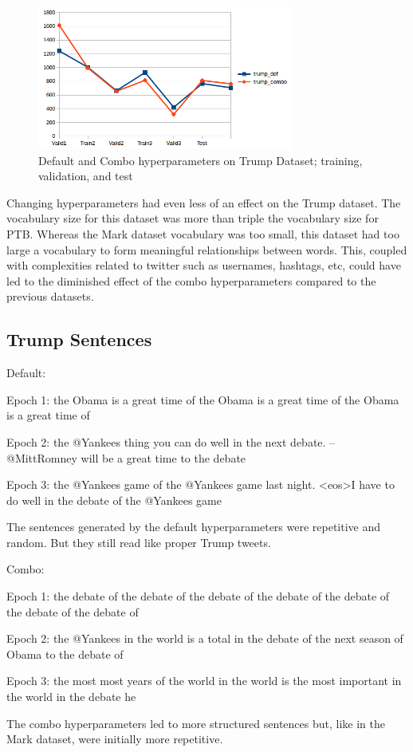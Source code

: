 \documentclass[10pt,a4paper]{article}
\begin{document}
\begin{figure}[H]
  \begin{center}
    \includegraphics[width=0.75\textwidth] {trump2.png}
    \caption{Default and Combo hyperparameters on Trump Dataset; training, validation, and test}
  \end{center}
\end{figure}

Changing hyperparameters had even less of an effect on the Trump dataset. The vocabulary size for this dataset was more than triple the vocabulary size for PTB. Whereas the Mark dataset vocabulary was too small, this dataset had too large a vocabulary to form meaningful relationships between words. This, coupled with complexities related to twitter such as usernames, hashtags, etc, could have led to the  diminished effect of the combo hyperparameters compared to the previous datasets.

\subsection{Trump Sentences}
Default:


Epoch 1: the Obama is a great time of the Obama is a great time of the Obama is a great time of

Epoch 2: the @Yankees thing you can do well in the next debate. -- @MittRomney will be a great time to the debate

Epoch 3: the @Yankees game of the @Yankees game last night. <eos>I have to do well in the debate of the @Yankees game

The sentences generated by the default hyperparameters were repetitive and random. But they still read like proper Trump tweets.



Combo:


Epoch 1: the debate of the debate of the debate of the debate of the debate of the debate of the debate of

Epoch 2: the @Yankees in the world is a total in the debate of the next season of Obama to the debate of

Epoch 3: the most most years of the world in the world is the most important in the world in the debate he

The combo hyperparameters led to more structured sentences but, like in the Mark dataset, were initially more repetitive. 
\end{document}
